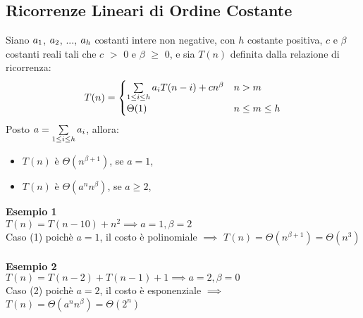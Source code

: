 \documentclass[../cheatSheetAlgoritmi.tex]{subfiles}
\begin{document}
\subsection{Ricorrenze Lineari di Ordine Costante}
Siano $a\textsubscript{$1$}$, $a\textsubscript{$2$}$, $...$, $a\textsubscript{$h$}$ costanti intere non negative, con $h$ costante positiva, $c$ e $\beta$ costanti reali tali che $c$ $>$ 0 e $\beta$ $\geq$ 0, e sia $T(n)$ definita dalla relazione di ricorrenza:
	\begin{equation*}
  		T(n)=\begin{cases}
     		\sum\limits_{1 \leq i \leq h} {a \textsubscript{$i$} T(n-i)} + cn^{\beta} & \text{$n > m$}\\
    		\Theta(1) & \text{$n \leq m \leq h$}
  		\end{cases}
	\end{equation*}
Posto $a = \sum\limits_{1 \leq i \leq h} {a \textsubscript{$i$}}$, allora: 
\begin{itemize}
	\item $T(n)$ è $\Theta(n^{\beta+1})$, se $a = 1$,
	\item $T(n)$ è $\Theta(a^{n}n^{\beta})$, se $a \geq 2$,
\end{itemize}
\textbf{Esempio 1}\\
$T(n) = T(n - 10) + n^{2} \implies a = 1, \beta = 2$\\
Caso (1) poichè $a = 1$, il costo è polinomiale $\implies$ $T(n) = \Theta(n^{\beta+1}) = \Theta(n^{3})$\\\\
\textbf{Esempio 2}\\
$T(n) = T(n - 2) +  T(n - 1) + 1 \implies a = 2, \beta = 0$\\
Caso (2) poichè $a = 2$, il costo è esponenziale $\implies$ $T(n) = \Theta(a^{n}n^{\beta}) = \Theta(2^n)$
\newpage
\end{document}
